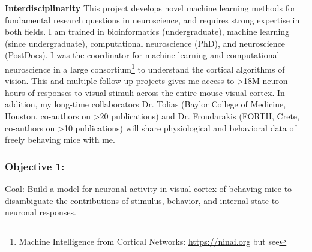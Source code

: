 \documentclass[COG,11pt]{ercgrant}
\begin{document}
\textbf{Interdisciplinarity} This project develops novel machine learning methods for fundamental research questions in neuroscience, and requires strong expertise in both fields. 
I am trained in bioinformatics (undergraduate), machine learning (since undergraduate), computational neuroscience (PhD), and neuroscience (PostDocs). 
I was the coordinator for machine learning and computational neuroscience in a large consortium\footnote{Machine Intelligence from Cortical Networks: \url{https://ninai.org} but see } to understand the cortical algorithms of vision.
This and multiple follow-up projects gives me access to >18M neuron-hours of responses to visual stimuli across the entire mouse visual cortex. In addition, my long-time collaborators Dr. Tolias (Baylor College of Medicine, Houston, co-authors on >20  publications) and Dr. Froudarakis (FORTH, Crete, co-authors on >10 publications) will share physiological and behavioral data of freely behaving mice with me. 






\subsubsection{Objective 1: \oonetitle\hfill{}}
\underline{Goal:} Build a model for neuronal activity in visual cortex of behaving mice to disambiguate the contributions of stimulus, behavior, and internal state to neuronal responses. 

\end{document}
